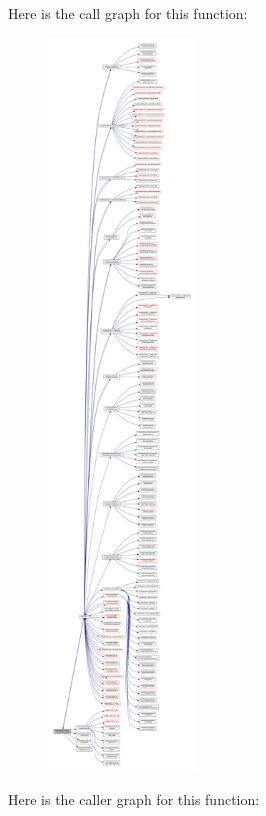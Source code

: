 Here is the call graph for this function\+:\nopagebreak
\begin{figure}[H]
\begin{center}
\leavevmode
\includegraphics[height=550pt]{namespacemodulecfpolcomformat_a2792438e0105569c0bc2d1dc532a27b6_cgraph}
\end{center}
\end{figure}
Here is the caller graph for this function\+:\nopagebreak
